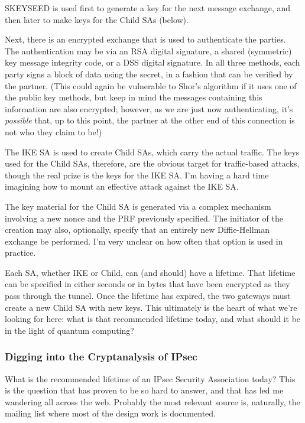 \documentclass[%
 aip,
 jmp,%
 amsmath,amssymb,
 reprint,%
]{revtex4-1}
\begin{document}
SKEYSEED is used first to generate a key for the next message
exchange, and then later to make keys for the Child SAs (below).

Next, there is an encrypted exchange that is used to authenticate the
parties.  The authentication may be via an RSA digital signature, a
shared (symmetric) key message integrity code, or a DSS digital
signature.  In all three methods, each party signs a block of data
using the secret, in a fashion that can be verified by the partner.
(This could again be vulnerable to Shor's algorithm if it uses one of
the public key methods, but keep in mind the messages containing this
information are also encrypted; however, as we are just now
authenticating, it's \emph{possible} that, up to this point, the partner at
the other end of this connection is not who they claim to be!)

The IKE SA is used to create Child SAs, which carry the actual
traffic.  The keys used for the Child SAs, therefore, are the obvious
target for traffic-based attacks, though the real prize is the keys
for the IKE SA.  I'm having a hard time imagining how to mount an
effective attack against the IKE SA.

The key material for the Child SA is generated via a complex mechanism
involving a new nonce and the PRF previously specified.  The initiator
of the creation may also, optionally, specify that an entirely new
Diffie-Hellman exchange be performed.  I'm very unclear on how often
that option is used in practice.

Each SA, whether IKE or Child, can (and should) have a lifetime.  That
lifetime can be specified in either seconds or in bytes that have been
encrypted as they pass through the tunnel.  Once the lifetime has
expired, the two gateways must create a new Child SA with new keys.
This ultimately is the heart of what we're looking for here: what is
that recommended lifetime today, and what should it be in the light of
quantum computing?

\subsubsection{Digging into the Cryptanalysis of IPsec}

What is the recommended lifetime of an IPsec Security Association
today?  This is the question that has proven to be so hard to answer,
and that has led me wandering all across the web.  Probably the most
relevant source is, naturally, the mailing list where most of the
design work is documented.
\end{document}
